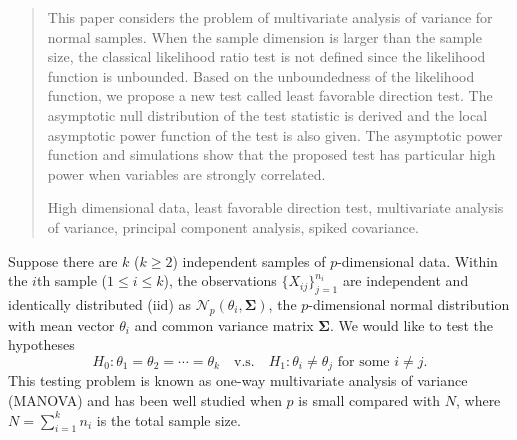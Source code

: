 \documentclass[12pt]{article} %
\renewcommand{\theequation}{\thesection\arabic{equation}}
\newcommand{\bfsym}[1]{\ensuremath{\boldsymbol{#1}}}
\def\bSigma {\bfsym {\Sigma}}
\theoremstyle{definition}
\begin{document}
\begin{quotation}
This paper considers the problem of multivariate analysis of variance for normal samples.
    When the sample dimension is larger than the sample size, the classical likelihood ratio test is not defined since the likelihood function is unbounded.
    Based on the unboundedness of the likelihood function, we propose a new test called least favorable direction test.
    The asymptotic null distribution of the test statistic is derived and the local asymptotic power function of the test is also given.
    The asymptotic power function and simulations show that the proposed test has particular high power when variables are strongly correlated.

\vspace{9pt}
    High dimensional data, least favorable direction test, multivariate analysis of variance, principal component analysis, spiked covariance.
\par
\end{quotation}\par



\def\thefigure{\arabic{figure}}
\def\thetable{\arabic{table}}

\renewcommand{\theequation}{\thesection.\arabic{equation}}


\fontsize{12}{14pt plus.8pt minus .6pt}\selectfont

\setcounter{section}{1} %
\setcounter{equation}{0} %

Suppose there are $k$ ($k\geq 2$) independent samples of $p$-dimensional data.
Within the $i$th sample ($1\leq i\leq k$), the observations $\{X_{ij}\}_{j=1}^{n_i}$ are independent and identically distributed (iid) as $\mathcal{N}_p(\theta_i,\bSigma)$, the $p$-dimensional normal distribution with mean vector $\theta_i$ and common variance matrix $\bSigma$.
We would like to test the hypotheses
\begin{equation}\label{hypothesis}
    H_0: \theta_1=\theta_2=\cdots=\theta_k\quad \text{v.s.}\quad　H_1: \text{$\theta_i\neq \theta_j$ for some $i\neq j$}.
\end{equation}
This testing problem is known as one-way multivariate analysis of variance (MANOVA) and has been well studied when $p$ is small compared with $N$, where $N=\sum_{i=1}^k n_i$ is the total sample size.
\end{document}
